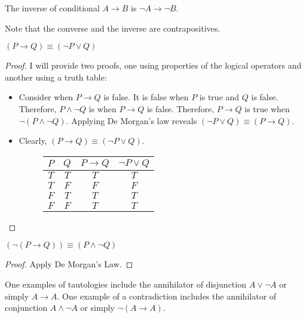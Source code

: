 \bigskip
\begin{definition}
    The inverse of conditional \(A\rightarrow B\) is \(\lnot A\rightarrow\lnot B\).
\end{definition}

Note that the converse and the inverse are contrapositives. 

\bigskip

\begin{proposition}
    \((P\rightarrow Q)\equiv(\lnot P\lor Q)\)
\end{proposition}
\begin{proof}
    I will provide two proofs, one using properties of the logical operators and another using a truth table:
    \begin{itemize}
        \item Consider when \(P\rightarrow Q\) is false. It is false when \(P\) is true and \(Q\) is false. Therefore,
        \(P\land\lnot Q\) is when \(P\rightarrow Q\) is false. Therefore, \(P\rightarrow Q\) is true when \(\lnot(P\land\lnot Q)\).
        Applying De Morgan's law reveals \((\lnot P\lor Q)\equiv(P\rightarrow Q)\).
        \item Clearly, \((P\rightarrow Q)\equiv(\lnot P\lor Q)\).
        \begin{figure}[H]
            \centering
            \begin{tabular}{cccc}
                \(P\) & \(Q\) & \(P\rightarrow Q\) & \(\lnot P\lor Q\) \\
                \hline
                \(T\) & \(T\) & \(T\) & \(T\) \\
                \(T\) & \(F\) & \(F\) & \(F\) \\
                \(F\) & \(T\) & \(T\) & \(T\) \\
                \(F\) & \(F\) & \(T\) & \(T\)
            \end{tabular}
        \end{figure}
    \end{itemize}
\end{proof}

\begin{corollary}
    \((\lnot(P\rightarrow Q))\equiv(P\land\lnot Q)\)
\end{corollary}
\begin{proof}
    Apply De Morgan's Law.
\end{proof}

\bigskip
One examples of tautologies include the annihilator of disjunction \(A\lor\lnot A\) or simply \(A\rightarrow A\). One example of a 
contradiction includes the annihilator of conjunction \(A\land\lnot A\) or simply \(\lnot(A\rightarrow A)\). 

